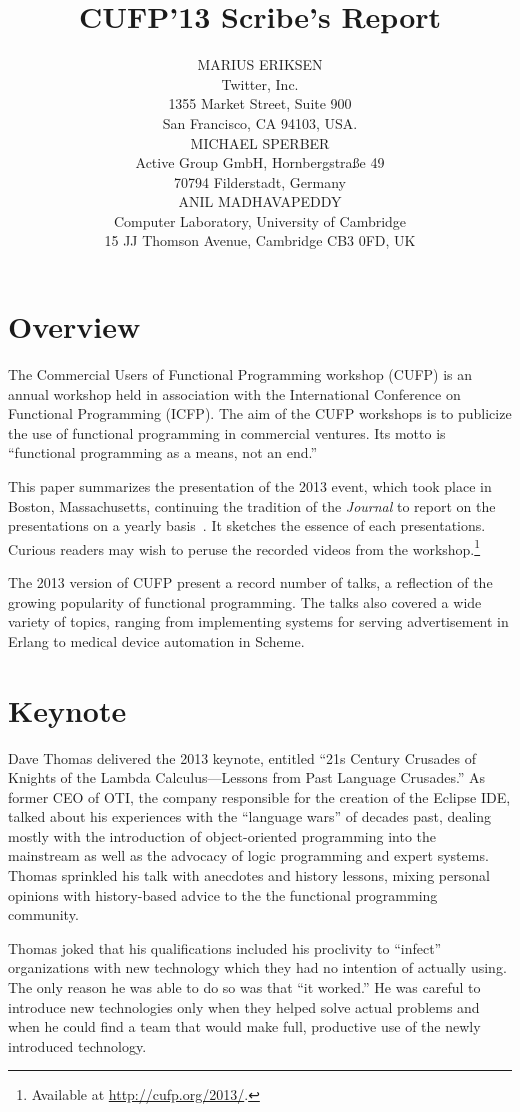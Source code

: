 \documentclass{jfp1}
\title{CUFP'13 Scribe's Report}
\author[Marius Eriksen, Michael Sperber and Anil Madhavapeddy]
       {MARIUS ERIKSEN\\
        Twitter, Inc.\\
        1355 Market Street, Suite 900 \\
        San Francisco, CA 94103, USA.\\
        MICHAEL SPERBER\\
         Active Group GmbH, Hornbergstra\ss{}e 49\\
         70794 Filderstadt, Germany\\
         ANIL MADHAVAPEDDY\\
        Computer Laboratory, University of Cambridge\\ 
        15 JJ Thomson Avenue, Cambridge CB3 0FD, UK}
\begin{document}
\maketitle


\section{Overview}

The Commercial Users of Functional Programming workshop (CUFP) is an annual
 workshop held in association with the International Conference on
 Functional Programming (ICFP).  The aim of the CUFP workshops is to
 publicize the use of functional programming in commercial ventures. Its
 motto is ``functional programming as a means, not an end.''

This paper summarizes the presentation of the 2013 event, which took place
 in Boston, Massachusetts, continuing the tradition of the {\it Journal\/}
 to report on the presentations on a yearly
 basis~\cite{JFP:9147276,JFP:8514633}. It sketches the essence of each
 presentations. Curious readers may wish to peruse the recorded videos from
 the workshop.\footnote{Available at \url{http://cufp.org/2013/}.}

The 2013 version of CUFP present a record number of talks, a reflection of
 the growing popularity of functional programming. The talks also covered a
 wide variety of topics, ranging from implementing systems for serving
 advertisement in Erlang to medical device automation in Scheme.

\section{Keynote}

Dave Thomas delivered the 2013 keynote, entitled ``21s Century Crusades of
Knights of the Lambda Calculus---Lessons from Past Language Crusades.''  As
former CEO of OTI, the company responsible for the creation of the Eclipse
IDE, talked about his experiences with the ``language wars'' of decades
past, dealing mostly with the introduction of object-oriented programming
into the mainstream as well as the advocacy of logic programming and expert
systems. Thomas sprinkled his talk with anecdotes and history lessons,
mixing personal opinions with history-based advice to the the functional
programming community.


Thomas joked that his qualifications included his proclivity to ``infect''
organizations with new technology which they had no intention of actually
using. The only reason he was able to do so was that ``it worked.'' He was
careful to introduce new technologies only when they helped solve actual
problems and when he could find a team that would make full, productive use
of the newly introduced technology.
\end{document}
